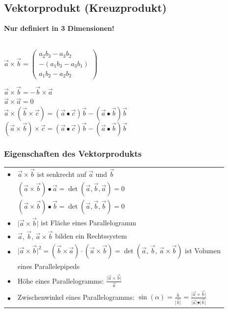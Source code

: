 		    
		    
		    
			\subsection{Vektorprodukt (Kreuzprodukt)}		    
		    \textbf{Nur definiert in 3 Dimensionen!} \\
		    \\
		    \begin{minipage}{0.45\linewidth}
		    $\vec{a} \times \vec{b} = \begin{pmatrix} a_2 b_3 - a_3 b_2 \\ -(a_1 b_3 - a_3 b_1) \\ a_1 b_2 - a_2 b_2 \end{pmatrix}$ \\
		    \end{minipage}
		    \hfill
		    \begin{minipage}{0.5\linewidth}
		    $\vec{a} \times \vec{b} = -\vec{b} \times \vec{a}$ \\
		    $\vec{a} \times \vec{a} = 0$ \\
		    $\vec{a} \times (\vec{b} \times \vec{c}) = (\vec{a} \bullet \vec{c}) \vec{b} - (\vec{a} \bullet \vec{b}) \vec{b}$ \\
		    $(\vec{a} \times \vec{b}) \times \vec{c} = (\vec{a} \bullet \vec{c}) \vec{b} - (\vec{a} \bullet \vec{b}) \vec{b}$
		    \end{minipage}
		    
		    
		    \subsubsection{Eigenschaften des Vektorprodukts}
		    
		    \begin{tabular}{ll}
		    $\bullet$ & $\vec{a} \times \vec{b}$ ist senkrecht auf $\vec{a}$ und $\vec{b}$\\
		    & $( \vec{a} \times \vec{b}) \bullet \vec{a} = \det(\vec{a}, \vec{b}, \vec{a}) = 0$\\
		    & $( \vec{a} \times \vec{b}) \bullet \vec{b} = \det(\vec{a}, \vec{b}, \vec{b}) = 0$\\
		    $\bullet$ & $\vert \vec{a} \times \vec{b} \vert$ ist Fläche eines Parallelogramm \\ 
		    $\bullet$ & $\vec{a}, \, \vec{b}, \, \vec{a} \times \vec{b}$ bilden ein Rechtssystem \\
		    $\bullet$ & $\vert \vec{a} \times \vec{b} \vert ^2 = (\vec{b} \times \vec{a}) \cdot (\vec{a} \times \vec{b}) = \det(\vec{a}, \, \vec{b}, \, \vec{a} \times \vec{b})$  ist Volumen\\
		    &  eines Parallelepipeds \\
		    $\bullet$ & Höhe eines Parallelogramms: $\frac{\vert \vec{a} \times \vec{b} \vert}{\vec{a}}$ \\
		      $\bullet$ & Zwischenwinkel eines Parallelogramms: $\sin(\alpha) = \frac{h}{\vert \vec{b} \vert} = \frac{\vert \vec{a} \times \vec{b} \vert}{\vert \vec{a} \vert \bullet \vert \vec{b} \vert}$ \\
		    \end{tabular}
		    

